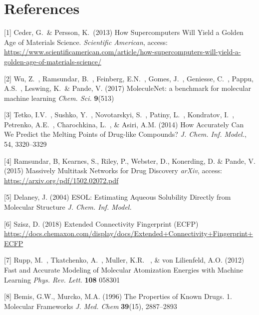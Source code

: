 \documentclass{article}
\begin{document}
\section*{References}
\small
[1] Ceder, G.\ \& Persson, K.\ (2013) How Supercomputers Will Yield a Golden Age of Materials Science. {\it Scientific American}, access: \url{https://www.scientificamerican.com/article/how-supercomputers-will-yield-a-golden-age-of-materials-science/}

[2] Wu, Z.\ , Ramsundar, B.\ , Feinberg, E.N.\ , Gomes, J.\ , Geniesse, C.\ , Pappu, A.S.\ , Leswing, K.\ \& Pande, V. (2017) MoleculeNet: a benchmark for molecular machine learning {\it Chem. Sci.}  {\bf 9}(513)

[3] Tetko, I.V.\ , Sushko, Y.\ , Novotarskyi, S.\ , Patiny, L.\ , Kondratov, I.\ , Petrenko, A.E.\ , Charochkina, L.\ , \& Asiri, A.M. (2014) How Accurately Can We Predict the Melting Points of Drug-like
Compounds? {\it J. Chem. Inf. Model.}, 54, 3320--3329

[4] Ramsundar, B, Kearnes, S., Riley, P., Webster, D., Konerding, D. \& Pande, V. (2015) Massively Multitask Networks for Drug Discovery {\it arXiv}, access: \url{https://arxiv.org/pdf/1502.02072.pdf}

[5] Delaney, J. (2004) ESOL: Estimating Aqueous Solubility Directly from Molecular Structure {\it J. Chem. Inf. Model.}

[6] Szisz, D. (2018) Extended Connectivity Fingerprint (ECFP) \url{https://docs.chemaxon.com/display/docs/Extended+Connectivity+Fingerprint+ECFP}

[7] Rupp, M.\ , Tkatchenko, A.\ , Muller, K.R. \ , \& von Lilienfeld, A.O. (2012) Fast and Accurate Modeling of Molecular Atomization Energies with Machine Learning {\it Phys. Rev. Lett.} \textbf{108} 058301

[8] Bemis, G.W., Murcko, M.A. (1996) The Properties of Known Drugs. 1. Molecular Frameworks {\it J. Med. Chem} \textbf{39}(15), 2887–2893
\end{document}
